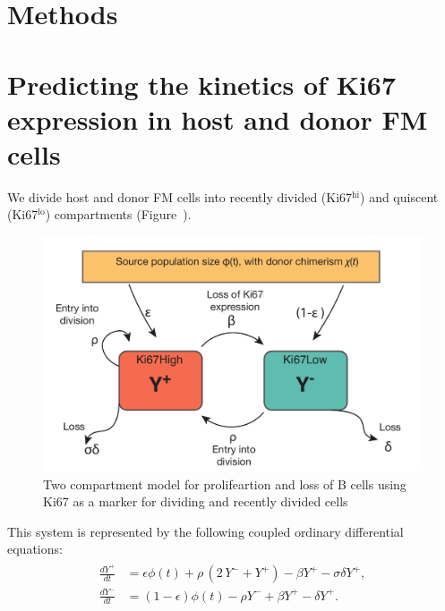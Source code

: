 \documentclass[11pt]{article}
\newcommand{\khi}{Ki67$^\text{hi}$}
\newcommand{\klo}{Ki67$^\text{lo}$}
\begin{document}
\clearpage

\section*{Methods}

\section*{Predicting the kinetics of Ki67 expression in host and donor FM cells}

We divide host and donor FM cells into recently divided (\khi) and quiscent (\klo) compartments (Figure~\label{fig:Ki67schematic}).

\begin{figure}[htbp]
	\centerline{\includegraphics[scale = 0.5] {TwoComp_ki67.pdf}}
	\caption{Two compartment model for prolifeartion and loss of B cells using Ki67 as a marker for dividing and recently divided cells \label{fig:Ki67schematic}}
\end{figure}

This system is represented by the following coupled ordinary differential equations:
\begin{eqnarray}
\begin{aligned}
\frac{dY^+}{dt} &= \epsilon \phi(t)  + \rho \, (2\, Y^- + Y^+) - \beta Y^+ - \sigma \delta Y^+ ,\\
\frac{dY^-}{dt} &=  (1-\epsilon) \phi(t) - \rho Y^-  + \beta Y^+ - \delta  Y^+.
\end{aligned}
\label{general_ode}
\end{eqnarray}
\end{document}
